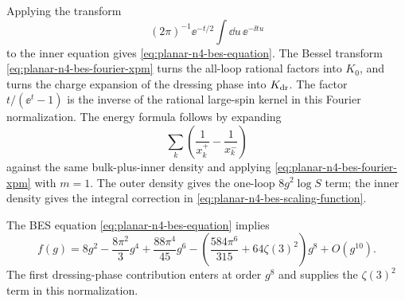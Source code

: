 Applying the transform
\[
  (2\pi)^{-1}\ee^{-t/2}\int\dd u\,\ee^{-\ii t u}
\]
to the inner equation gives \eqref{eq:planar-n4-bes-equation}.  The Bessel transform
\eqref{eq:planar-n4-bes-fourier-xpm} turns the all-loop rational factors into
\(K_0\), and turns the charge expansion of the dressing phase into
\(K_{\rm dr}\).  The factor \(t/(\ee^t-1)\) is the inverse of the rational
large-spin kernel in this Fourier normalization.  The energy formula follows
by expanding
\[
  \sum_k\left(
  \frac1{x_k^+}-\frac1{x_k^-}
  \right)
\]
against the same bulk-plus-inner density and applying
\eqref{eq:planar-n4-bes-fourier-xpm} with \(m=1\).  The outer density gives
the one-loop \(8g^2\log S\) term; the inner density gives the integral
correction in \eqref{eq:planar-n4-bes-scaling-function}.

\begin{proposition}
\label{prop:planar-n4-bes-weak-scaling-function}
The BES equation \eqref{eq:planar-n4-bes-equation} implies
\begin{equation}
  f(g)
  =
  8g^2-\frac{8\pi^2}{3}g^4+\frac{88\pi^4}{45}g^6
  -
  \left(\frac{584\pi^6}{315}+64\zeta(3)^2\right)g^8
  +O(g^{10}).
  \label{eq:planar-n4-bes-weak-scaling-function}
\end{equation}
The first dressing-phase contribution enters at order \(g^8\) and supplies
the \(\zeta(3)^2\) term in this normalization.
\end{proposition}

